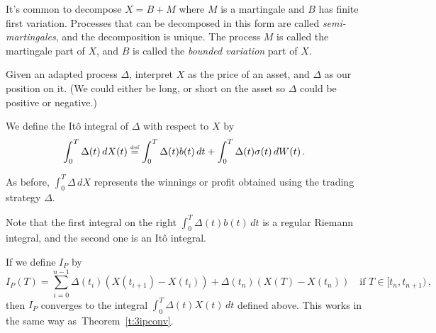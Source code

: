 \begin{remark}
  It's common to decompose $X = B + M$ where $M$ is a martingale and $B$ has finite first variation.
  Processes that can be decomposed in this form are called \emph{semi-martingales}, and the decomposition is unique.
  The process $M$ is called the martingale part of $X$, and $B$ is called the \emph{bounded variation} part of $X$.
\end{remark}

Given an adapted process $\Delta$, interpret $X$ as the price of an asset, and $\Delta$ as our position on it.
(We could either be long, or short on the asset so $\Delta$ could be positive or negative.)

\begin{definition}
  We define the It\^o integral of $\Delta$ with respect to $X$ by
  \begin{equation*}
    \int_0^T \Delta(t) \, dX(t)
      \stackrel{\scriptscriptstyle\textup{def}}{=} \int_0^T \Delta(t) b(t) \, dt 
	+ \int_0^T \Delta(t) \sigma(t) \, dW(t)\,.
  \end{equation*}
\end{definition}

As before, $\int_0^T \Delta \, dX$ represents the winnings or profit obtained using the trading strategy $\Delta$.

\begin{remark}
  Note that the first integral on the right $\int_0^T \Delta(t) b(t) \, dt$ is a regular Riemann integral, and the second one is an It\^o integral.
\end{remark}

\begin{remark}
  If we define $I_P$ by
  \begin{equation*}
    I_P(T)
      = \sum_{i=0}^{n-1} \Delta(t_i) (X(t_{i+1}) - X(t_i))
	+ \Delta(t_n) (X(T) - X(t_n))
    \quad\text{if } T \in [t_n, t_{n+1})\,,
  \end{equation*}
  then $I_P$ converges to the integral $\int_0^T \Delta(t) X(t) \, dt$ defined above.
  This works in the same way as~Theorem~\ref{t:3ipconv}.
\end{remark}


